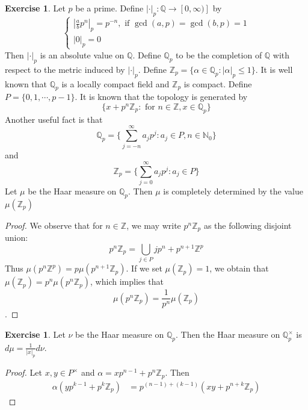 \documentclass[12pt]{amsart}
\theoremstyle{definition}
\newtheorem{ex}[definition]{Exercise}
\newcommand{\al}{\alpha}
\newcommand{\N}{\mathbb{N}}
\newcommand{\Z}{\mathbb{Z}}
\newcommand{\Q}{\mathbb{Q}}
\newcommand{\lex}[1]{\label{ex:#1}}
\begin{document}
	\begin{ex} \lex{00000} 
		Let $p$ be a prime. Define $|\cdot |_p: \Q \rightarrow [0, \infty)]$ by 
		\[
		\begin{cases}
			|\frac{a}{b}p^n|_p = p^{-n}, \text{ if } \gcd(a,p) = \gcd(b,p) = 1 \\
			|0|_p = 0
		\end{cases}
		\]
		Then $|\cdot|_p$ is an absolute value on $\Q$. Define $\Q_p$ to be the completion of $\Q$ with respect to the metric induced by $|\cdot|_p$. Define $\Z_p = \{\al \in \Q_p: |\al|_p \leq 1 \}$. It is well known that $\Q_p$ is a locally compact field and $\Z_p$ is compact. Define $P = \{0, 1, \cdots, p-1\}$. It is known that the topology is generated by  $$\{x + p^n\Z_p: \text{ for } n \in \Z, x \in \Q_p\}$$ Another useful fact is that $$\Q_p = \{\sum_{j = -n}^{\infty} a_jp^j : a_j \in P, n \in \N_0\}$$ and $$\Z_p = \{\sum_{j = 0}^{\infty} a_jp^j : a_j \in P\}$$ 
		Let $\mu$ be the Haar measure on $\Q_p$. Then $\mu$ is completely determined by the value $\mu(\Z_p)$  
	\end{ex}

	\begin{proof}
		We observe that for $n \in \Z$, we may write $p^n \Z_p$ as the following disjoint union: $$p^n\Z_p = \bigcup\limits_{j \in P} jp^n + p^{n+1}\Z^p$$ Thus $\mu(p^n \Z^{p}) = p \mu(p^{n+1}\Z_p)$. If we set $\mu(\Z_p) = 1$, we obtain that $\mu(\Z_p) = p^n \mu(p^n\Z_p)$, which implies that $$\mu(p^n \Z_p) = \frac{1}{p^n}\mu(\Z_p)$$.  
	\end{proof}
	
	\begin{ex} \lex{00000} 
		Let $\nu$ be the Haar measure on $\Q_p$. Then the Haar measure on $\Q_p^{\times}$  is $d \mu = \frac{1}{|x|_p}d \nu$.
	\end{ex}

	\begin{proof}
		Let $x, y \in P^{\times}$ and $\al = xp^{n-1} + p^n\Z_p$. Then 
		\begin{align*}
			\al (yp^{k-1} + p^k \Z_p) 
			& = p^{(n-1)+ (k-1)}(xy + p^{n+k} \Z_p) 
		\end{align*}
	\end{proof}
	
	
	
	
	
	
	
	
	
	
	
	
	
	
	
\end{document}

